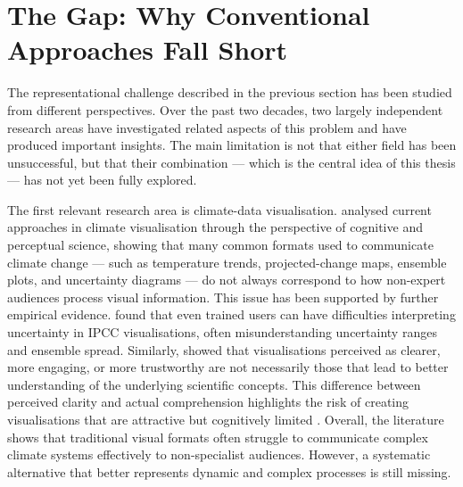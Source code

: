 \section{The Gap: Why Conventional Approaches Fall Short}
\label{sec:gap-approaches}

The representational challenge described in the previous section has been studied from different perspectives. Over the past two decades, two largely independent research areas have investigated related aspects of this problem and have produced important insights. The main limitation is not that either field has been unsuccessful, but that their combination --- which is the central idea of this thesis --- has not yet been fully explored.

The first relevant research area is climate-data visualisation. \citet{harold2016} analysed current approaches in climate visualisation through the perspective of cognitive and perceptual science, showing that many common formats used to communicate climate change --- such as temperature trends, projected-change maps, ensemble plots, and uncertainty diagrams --- do not always correspond to how non-expert audiences process visual information. This issue has been supported by further empirical evidence. \citet{mcmahon2015} found that even trained users can have difficulties interpreting uncertainty in IPCC visualisations, often misunderstanding uncertainty ranges and ensemble spread. Similarly, \citet{kause2020} showed that visualisations perceived as clearer, more engaging, or more trustworthy are not necessarily those that lead to better understanding of the underlying scientific concepts. This difference between perceived clarity and actual comprehension highlights the risk of creating visualisations that are attractive but cognitively limited \citep{sheppard2015}. Overall, the literature shows that traditional visual formats often struggle to communicate complex climate systems effectively to non-specialist audiences. However, a systematic alternative that better represents dynamic and complex processes is still missing.

